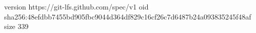 version https://git-lfs.github.com/spec/v1
oid sha256:48efdbb7455bd905fbc9044d364df829c16cf26c7d6487b24a093835245f48af
size 339
